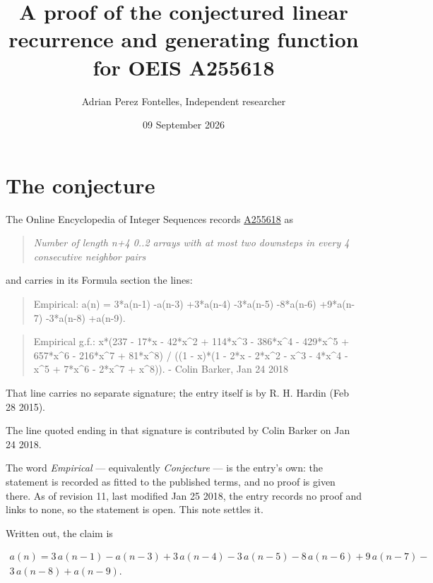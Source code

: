 \documentclass[11pt]{article}
\title{A proof of the conjectured linear recurrence and generating function for OEIS A255618}
\author{Adrian Perez Fontelles, Independent researcher}
\date{09 September 2026}
\theoremstyle{definition}
\begin{document}
\maketitle
\section{The conjecture}

The Online Encyclopedia of Integer Sequences records \href{https://oeis.org/A255618}{A255618} as

\begin{quote}\itshape Number of length n+4 0..2 arrays with at most two downsteps in every 4 consecutive neighbor pairs\end{quote}

and carries in its Formula section the lines:

\begin{quote}\ttfamily Empirical: a(n) = 3*a(n-1) -a(n-3) +3*a(n-4) -3*a(n-5) -8*a(n-6) +9*a(n-7) -3*a(n-8) +a(n-9).\end{quote}

\begin{quote}\ttfamily Empirical g.f.: x*(237 - 17*x - 42*x\textasciicircum{}2 + 114*x\textasciicircum{}3 - 386*x\textasciicircum{}4 - 429*x\textasciicircum{}5 + 657*x\textasciicircum{}6 - 216*x\textasciicircum{}7 + 81*x\textasciicircum{}8) / ((1 - x)*(1 - 2*x - 2*x\textasciicircum{}2 - x\textasciicircum{}3 - 4*x\textasciicircum{}4 - x\textasciicircum{}5 + 7*x\textasciicircum{}6 - 2*x\textasciicircum{}7 + x\textasciicircum{}8)). - Colin Barker, Jan 24 2018\end{quote}

That line carries no separate signature; the entry itself is by R. H. Hardin (Feb 28 2015).

The line quoted ending in that signature is contributed by Colin Barker on Jan 24 2018.

The word {\itshape Empirical} --- equivalently {\itshape Conjecture} --- is the entry's own: the statement is recorded as fitted to the published terms, and no proof is given there. As of revision 11, last modified Jan 25 2018, the entry records no proof and links to none, so the statement is open. This note settles it.

Written out, the claim is

\begin{multline*} a(n) = 3\,a(n-1) - a(n-3) + 3\,a(n-4) - 3\,a(n-5) - 8\,a(n-6) + 9\,a(n-7) - \\ 3\,a(n-8) + a(n-9). \end{multline*}
\end{document}
